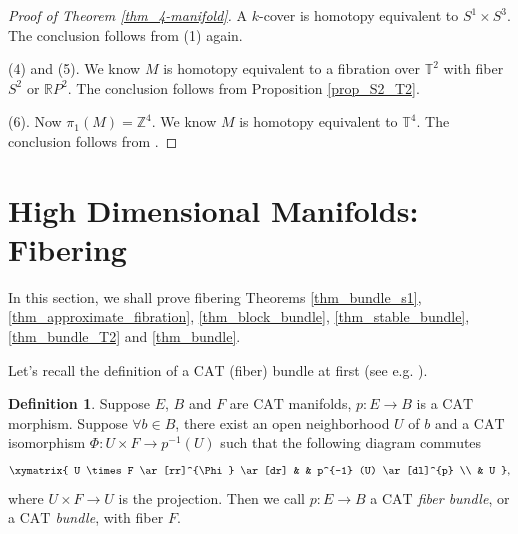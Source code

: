\documentclass[12pt]{amsart}
\theoremstyle{plain}
\theoremstyle{definition}
\newtheorem{definition}[theorem]{Definition}
\theoremstyle{question}
\theoremstyle{remark}
\theoremstyle{assumption}
\numberwithin{equation}{section}
\theoremstyle{bigthm}
\begin{document}
\begin{proof}[Proof of Theorem \ref{thm_4-manifold}]
A $k$-cover is homotopy equivalent to $S^{1} \times S^{3}$. The conclusion follows from (1) again.

(4) and (5). We know $M$ is homotopy equivalent to a fibration over $\mathbb{T}^{2}$ with fiber $S^{2}$ or $\mathbb{R}P^{2}$. The conclusion follows from Proposition \ref{prop_S2_T2}.

(6). Now $\pi_{1} (M) = \mathbb{Z}^{4}$. We know $M$ is homotopy equivalent to $\mathbb{T}^{4}$. The conclusion follows from \cite[\S~11.5]{Freedman_Quinn}.
\end{proof}

\section{High Dimensional Manifolds: Fibering}\label{sec_fibering}
In this section, we shall prove fibering Theorems \ref{thm_bundle_s1}, \ref{thm_approximate_fibration}, \ref{thm_block_bundle}, \ref{thm_stable_bundle}, \ref{thm_bundle_T2} and \ref{thm_bundle}.

Let's recall the definition of a $\mathrm{CAT}$ (fiber) bundle at first (see e.g. \cite[p.~10]{Kirby_Siebenmann}).
\begin{definition}
Suppose $E$, $B$ and $F$ are $\mathrm{CAT}$ manifolds, $p \colon  E \rightarrow B$ is a $\mathrm{CAT}$ morphism. Suppose $\forall b \in B$, there exist an open neighborhood $U$ of $b$ and a $\mathrm{CAT}$ isomorphism $\Phi \colon  U \times F \rightarrow p^{-1} (U)$ such that the following diagram commutes
\[
\xymatrix{
  U \times F \ar[rr]^{\Phi} \ar[dr]
                &  &    p^{-1} (U) \ar[dl]^{p}    \\
                & U                 },
\]
where $U \times F \rightarrow U$ is the projection. Then we call $p \colon  E \rightarrow B$ a \textit{$\mathrm{CAT}$ fiber bundle}, or a \textit{$\mathrm{CAT}$ bundle}, with fiber $F$.
\end{definition}
\end{document}
